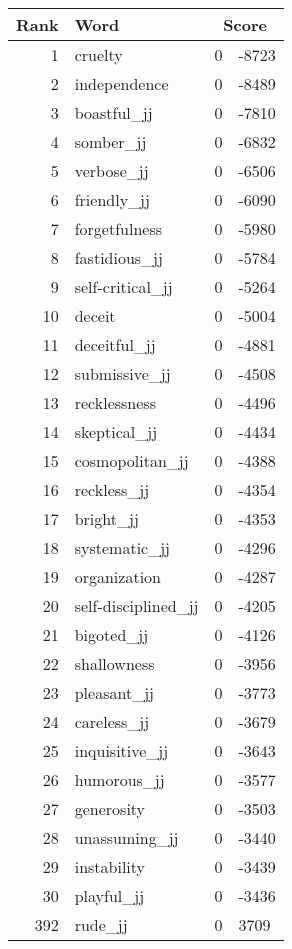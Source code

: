 \begin{longtable}[!htbp]{| rlr@{.}l |}
    \hline
    \textbf{Rank} & \textbf{Word} & \multicolumn{2}{c|}{\textbf{Score}} \\
    \hline
    \endhead
    1 & cruelty & 0 & -8723 \\
    2 & independence & 0 & -8489 \\
    3 & boastful\_jj & 0 & -7810 \\
    4 & somber\_jj & 0 & -6832 \\
    5 & verbose\_jj & 0 & -6506 \\
    6 & friendly\_jj & 0 & -6090 \\
    7 & forgetfulness & 0 & -5980 \\
    8 & fastidious\_jj & 0 & -5784 \\
    9 & self-critical\_jj & 0 & -5264 \\
    10 & deceit & 0 & -5004 \\
    11 & deceitful\_jj & 0 & -4881 \\
    12 & submissive\_jj & 0 & -4508 \\
    13 & recklessness & 0 & -4496 \\
    14 & skeptical\_jj & 0 & -4434 \\
    15 & cosmopolitan\_jj & 0 & -4388 \\
    16 & reckless\_jj & 0 & -4354 \\
    17 & bright\_jj & 0 & -4353 \\
    18 & systematic\_jj & 0 & -4296 \\
    19 & organization & 0 & -4287 \\
    20 & self-disciplined\_jj & 0 & -4205 \\
    21 & bigoted\_jj & 0 & -4126 \\
    22 & shallowness & 0 & -3956 \\
    23 & pleasant\_jj & 0 & -3773 \\
    24 & careless\_jj & 0 & -3679 \\
    25 & inquisitive\_jj & 0 & -3643 \\
    26 & humorous\_jj & 0 & -3577 \\
    27 & generosity & 0 & -3503 \\
    28 & unassuming\_jj & 0 & -3440 \\
    29 & instability & 0 & -3439 \\
    30 & playful\_jj & 0 & -3436 \\
    392 & rude\_jj & 0 & 3709 \\

\end{longtable}
